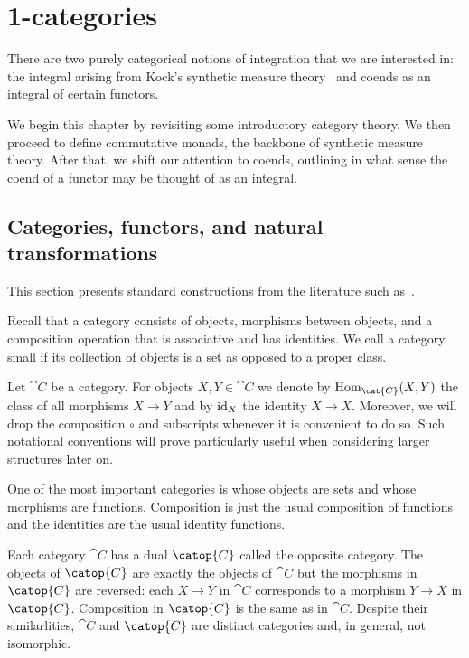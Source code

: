 \chapter{1-categories}\label{sec:synthetic_measure_theory_and_presheaves}

There are two purely categorical notions of integration that we are interested
in: the integral arising from Kock's synthetic measure theory~\cite{kock2011}
and coends as an integral of certain functors.

We begin this chapter by revisiting some introductory category theory. We then
proceed to define commutative monads, the backbone of synthetic measure theory.
After that, we shift our attention to coends, outlining in what sense the coend
of a functor may be thought of as an integral.

\section{Categories, functors, and natural transformations}\label{sec:categories}

This section presents standard constructions from the literature such as~\cite{maclane1997}.

Recall that a category consists of objects, morphisms between objects, and a
composition operation that is associative and has identities. We call a
category small if its collection of objects is a set as opposed to a proper
class.

Let $\cat{C}$ be a category. For objects $X,Y\in\cat{C}$ we denote by
$\Hom_{\cat{C}}(X,Y)$ the class of all morphisms $X\to Y$ and by $\operatorname{id}_X$ the
identity $X\to X$. Moreover, we will drop the composition $\circ$ and
subscripts whenever it is convenient to do so. Such notational conventions will
prove particularly useful when considering larger structures later on.

One of the most important categories is \Set{} whose objects are sets and whose
morphisms are functions. Composition is just the usual composition of functions
and the identities are the usual identity functions.

Each category $\cat{C}$ has a dual $\catop{C}$ called the opposite category.
The objects of $\catop{C}$ are exactly the objects of $\cat{C}$ but the
morphisms in $\catop{C}$ are reversed: each $X\to Y$ in $\cat{C}$
corresponds to a morphism $Y\to X$ in $\catop{C}$. Composition in $\catop{C}$
is the same as in $\cat{C}$. Despite their similarlities, $\cat{C}$ and
$\catop{C}$ are distinct categories and, in general, not isomorphic.

